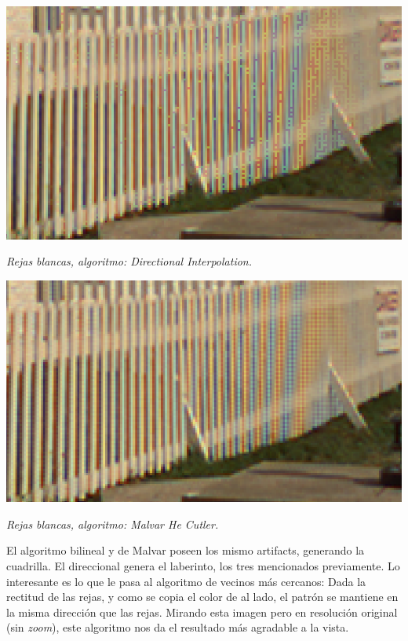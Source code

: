 	\begin{center}
		\includegraphics[scale=.5]{../enunciado/images_files/cualitativo/pharo_rails_directional.png}
		\vspace{2pt}
		\par
		\footnotesize\textit{Rejas blancas, algoritmo: Directional Interpolation.}
	\end{center}


	\begin{center}
		\includegraphics[scale=.5]{../enunciado/images_files/cualitativo/pharo_rails_malvar.png}
		\vspace{2pt}
		\par
		\footnotesize\textit{Rejas blancas, algoritmo: Malvar He Cutler.}
	\end{center}

El algoritmo bilineal y de Malvar poseen los mismo artifacts, generando la cuadrilla. El direccional genera el laberinto, los tres mencionados previamente. Lo interesante es lo que le pasa al algoritmo de vecinos más cercanos: Dada la rectitud de las rejas, y como se copia el color de al lado, el patrón se mantiene en la misma dirección que las rejas. Mirando esta imagen pero en resolución original (sin \textit{zoom}), este algoritmo nos da el resultado más agradable a la vista.




